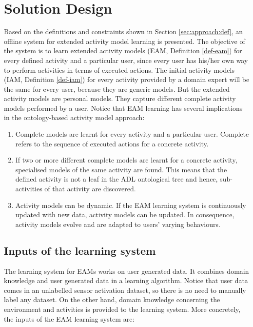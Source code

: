 \section{Solution Design}
\label{sec:approach:solution}

Based on the definitions and constraints shown in Section \ref{sec:approach:def}, an offline system for extended activity model learning is presented. The objective of the system is to learn extended activity models (EAM, Definition \ref{def-eam}) for every defined activity and a particular user, since every user has his/her own way to perform activities in terms of executed actions. The initial activity models (IAM, Definition \ref{def-iam}) for every activity provided by a domain expert will be the same for every user, because they are generic models. But the extended activity models are personal models. They capture different complete activity models performed by a user. Notice that EAM learning has several implications in the ontology-based activity model approach:

\begin{enumerate}
 \item Complete models are learnt for every activity and a particular user. Complete refers to the sequence of executed actions for a concrete activity.
 \item If two or more different complete models are learnt for a concrete activity, specialised models of the same activity are found. This means that the defined activity is not a leaf in the ADL ontological tree and hence, sub-activities of that activity are discovered.
 \item Activity models can be dynamic. If the EAM learning system is continuously updated with new data, activity models can be updated. In consequence, activity models evolve and are adapted to users' varying behaviours.
\end{enumerate}

\subsection{Inputs of the learning system}
\label{subsec:approach:inputs}

The learning system for EAMs works on user generated data. It combines domain knowledge and user generated data in a learning algorithm. Notice that user data comes in an unlabelled sensor activation dataset, so there is no need to manually label any dataset. On the other hand, domain knowledge concerning the environment and activities is provided to the learning system. More concretely, the inputs of the EAM learning system are:

